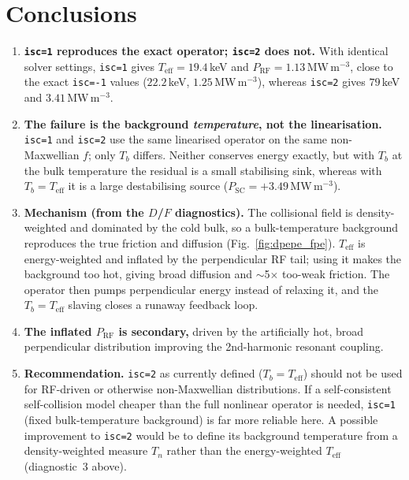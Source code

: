 \documentclass[11pt,a4paper]{article}
\begin{document}
\section{Conclusions}

\begin{enumerate}
  \item \textbf{\texttt{isc=1} reproduces the exact operator; \texttt{isc=2}
        does not.} With identical solver settings,
        \texttt{isc=1} gives $T_\text{eff} = 19.4$\,keV and
        $P_\text{RF} = 1.13$\,MW\,m$^{-3}$, close to the exact
        \texttt{isc=-1} values ($22.2$\,keV, $1.25$\,MW\,m$^{-3}$), whereas
        \texttt{isc=2} gives $79$\,keV and $3.41$\,MW\,m$^{-3}$.

  \item \textbf{The failure is the background \emph{temperature}, not the
        linearisation.} \texttt{isc=1} and \texttt{isc=2} use the same
        linearised operator on the same non-Maxwellian $f$; only $T_b$
        differs. Neither conserves energy exactly, but with $T_b$ at the bulk
        temperature the residual is a small stabilising sink, whereas with
        $T_b = T_\text{eff}$ it is a large destabilising source
        ($P_\text{SC} = +3.49$\,MW\,m$^{-3}$).

  \item \textbf{Mechanism (from the $D$/$F$ diagnostics).} The collisional
        field is density-weighted and dominated by the cold bulk, so a
        bulk-temperature background reproduces the true friction and diffusion
        (Fig.~\ref{fig:dpepe_fpe}). $T_\text{eff}$ is energy-weighted and
        inflated by the perpendicular RF tail; using it makes the background
        too hot, giving broad diffusion and $\sim$5$\times$ too-weak friction.
        The operator then pumps perpendicular energy instead of relaxing it,
        and the $T_b = T_\text{eff}$ slaving closes a runaway feedback loop.

  \item \textbf{The inflated $P_\text{RF}$ is secondary,} driven by the
        artificially hot, broad perpendicular distribution improving the
        2nd-harmonic resonant coupling.

  \item \textbf{Recommendation.} \texttt{isc=2} as currently defined
        ($T_b = T_\text{eff}$) should not be used for RF-driven or otherwise
        non-Maxwellian distributions. If a self-consistent self-collision
        model cheaper than the full nonlinear operator is needed,
        \texttt{isc=1} (fixed bulk-temperature background) is far more
        reliable here. A possible improvement to \texttt{isc=2} would be to
        define its background temperature from a density-weighted measure
        $T_n$ rather than the energy-weighted $T_\text{eff}$ (diagnostic~3
        above).
\end{enumerate}
\end{document}
